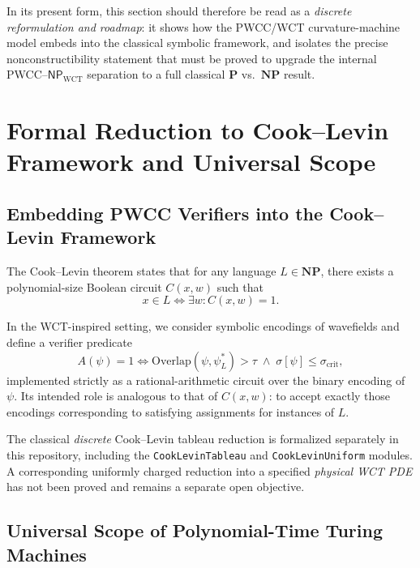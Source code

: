 \documentclass[12pt]{article}
\theoremstyle{remark}
\begin{document}
In its present form, this section should therefore be read as a \emph{discrete reformulation and roadmap}: it shows how the PWCC/WCT curvature-machine model embeds into the classical symbolic framework, and isolates the precise nonconstructibility statement that must be proved to upgrade the internal PWCC–\(\mathsf{NP}_{\mathrm{WCT}}\) separation to a full classical \( \mathbf{P} \) vs.\ \( \mathbf{NP} \) result.












\clearpage
\section{Formal Reduction to Cook--Levin Framework and Universal Scope}

\subsection{Embedding PWCC Verifiers into the Cook--Levin Framework}

The Cook--Levin theorem states that for any language \( L \in \mathbf{NP} \), there exists
a polynomial-size Boolean circuit \( C(x,w) \) such that
\[
x \in L \iff \exists w : C(x,w) = 1.
\]

In the WCT-inspired setting, we consider symbolic encodings of wavefields and define a
verifier predicate
\[
A(\psi) = 1 
\iff 
\mathrm{Overlap}(\psi, \psi^*_L) > \tau 
\;\land\; 
\sigma[\psi] \le \sigma_{\text{crit}},
\]
implemented strictly as a rational-arithmetic circuit over the binary encoding of
\(\psi\).  Its intended role is analogous to that of \(C(x,w)\): to accept exactly those
encodings corresponding to satisfying assignments for instances of \(L\).

The classical \emph{discrete} Cook--Levin tableau reduction is
formalized separately in this repository, including the
\texttt{CookLevinTableau} and \texttt{CookLevinUniform}
modules.  A corresponding uniformly charged reduction
into a specified \emph{physical WCT PDE} has not been
proved and remains a separate open objective.

\subsection{Universal Scope of Polynomial-Time Turing Machines}
\end{document}
